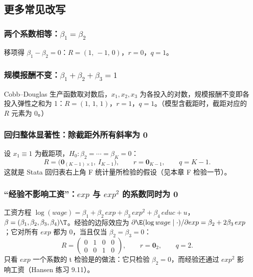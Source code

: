 \subsection{更多常见改写}

\subsubsection{两个系数相等：\texorpdfstring{$\beta_1=\beta_2$}{beta1 = beta2}}

移项得 $\beta_1-\beta_2=0$：$R=(1,\,-1,\,0)$，$r=0$，$q=1$。

\subsubsection{规模报酬不变：\texorpdfstring{$\beta_1+\beta_2+\beta_3=1$}{beta1 + beta2 + beta3 = 1}}

Cobb--Douglas 生产函数取对数后，$x_1,x_2,x_3$ 为各投入的对数，规模报酬不变即各投入弹性之和为 1：$R=(1,\,1,\,1)$，$r=1$，$q=1$。（模型含截距时，截距对应的 $R$ 元素为 0。）

\subsubsection{回归整体显著性：除截距外所有斜率为 0}

设 $x_1\equiv1$ 为截距项，$H_0:\beta_2=\cdots=\beta_K=0$：
\[
R=\bigl(\mathbf 0_{(K-1)\times1},\ I_{K-1}\bigr),\qquad r=\mathbf 0_{K-1},\qquad q=K-1 .
\]
这就是 Stata 回归表右上角 F 统计量所检验的假设（见本章 F 检验一节）。

\subsubsection{“经验不影响工资”：\texorpdfstring{$exp$}{exp} 与 \texorpdfstring{$exp^2$}{exp\^{}2} 的系数同时为 0}

工资方程 $\log(wage)=\beta_1+\beta_2\,exp+\beta_3\,exp^2+\beta_4\,educ+u$，$\beta=(\beta_1,\beta_2,\beta_3,\beta_4)\T$。经验的边际效应为 $\partial\E(\log wage\mid\cdot)/\partial exp=\beta_2+2\beta_3\,exp$；它对所有 $exp$ 都为 0，当且仅当 $\beta_2=\beta_3=0$：
\[
R=\begin{pmatrix}0&1&0&0\\0&0&1&0\end{pmatrix},\qquad r=\mathbf 0_2,\qquad q=2 .
\]
只看 $exp$ 一个系数的 t 检验是的做法：它只检验 $\beta_2=0$，而经验还通过 $exp^2$ 影响工资（Hansen 练习 9.11）。

